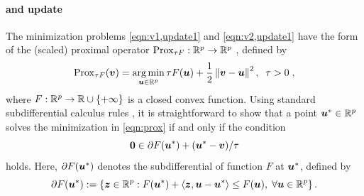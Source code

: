\paragraph{\va and \vb update}
The minimization problems \eqref{eqn:v1,update1} and \eqref{eqn:v2,update1} have the form of the (scaled) proximal operator $\mathrm{Prox}_{\tau F}:\mathbb{R}^p\to\mathbb{R}^p$ \citep{Rockafellar:1998:book}, defined by 
\begin{equation}
	\mathrm{Prox}_{\tau F}(\bm{v})= \operatorname*{arg\,min}_{\bm{u}\in\mathbb{R}^p}\tau F(\bm{u})+\frac{1}{2}\left\| \bm{v}-\bm{u} \right\|^2 ,\;\; \tau>0\;,
	\label{eqn:prox}
\end{equation}
where $F:\mathbb{R}^p\to\mathbb{R}\cup\{+\infty\}$ is a closed convex function.
Using standard subdifferential calculus rules \citep{Borwein:2006:book}, it is straightforward to show that a point ${\bm{u}}^*\in\mathbb{R}^p$ solves the minimization in \eqref{eqn:prox} if and only if the condition 
\begin{equation}
	{\ensuremath{\bm{0}}}\in \partial F({\bm{u}}^*)+({\bm{u}}^*-\bm{v})/\tau
	\label{eqn:prox,opt,cond}
\end{equation} 
holds.
Here, $\partial F({\bm{u}}^*)$ denotes the subdifferential of function $F$ at ${\bm{u}}^*$, defined by 
\begin{equation}
	\partial F({\bm{u}}^*):= \left\{ \bm{z}\in\mathbb{R}^p :
		 F({\bm{u}}^*) + \mathop{\langle \bm{z},{\bm{u}}-{\bm{u}}^*\rangle}\nolimits \leq F({\bm{u}}),\; \forall {\ensuremath{\bm{u}}}\in\mathbb{R}^p
						\right\}     .
\nonumber
\end{equation}

